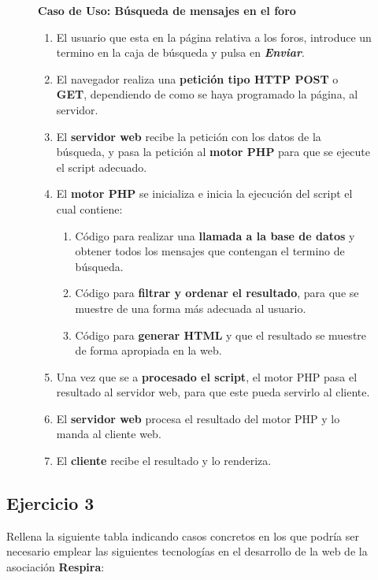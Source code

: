 \begin{figure}[H]
    \begin{tcolorbox}[sharp corners, colback=yellow!30, colframe=white!20]
        \textbf{Caso de Uso: Búsqueda de mensajes en el foro}
        \vspace{3ex}
        \begin{enumerate}
            \item El usuario que esta en la página relativa a los foros, introduce un termino en la caja de búsqueda y pulsa en \textbf{\textit{Enviar}}.
            \item El navegador realiza una \textbf{petición tipo HTTP POST} o \textbf{GET}, dependiendo de como se haya programado la página, al servidor.
            \item El \textbf{servidor web} recibe la petición con los datos de la búsqueda, y pasa la petición al \textbf{motor PHP} para que se ejecute el script adecuado.
            \item El \textbf{motor PHP} se inicializa e inicia la ejecución del script el cual contiene:
            \begin{enumerate}
                \item Código para realizar una \textbf{llamada a la base de datos} y obtener todos los mensajes que contengan el termino de búsqueda.
                \item Código para \textbf{filtrar y ordenar el resultado}, para que se muestre de una forma más adecuada al usuario.
                \item Código para \textbf{generar HTML}  y que el resultado se muestre de forma apropiada en la web.
            \end{enumerate}
            \item Una vez que se a \textbf{procesado el script}, el motor PHP pasa el resultado al servidor web, para que este pueda servirlo al cliente.
            \item El \textbf{servidor web} procesa el resultado del motor PHP y lo manda al cliente web.
            \item El \textbf{cliente} recibe el resultado y lo renderiza.
        \end{enumerate}
    \end{tcolorbox}
\end{figure}

\subsection{Ejercicio 3}
Rellena la siguiente tabla indicando casos concretos en los que podría ser necesario emplear las siguientes tecnologías en el desarrollo de la web de la asociación \textbf{Respira}:

